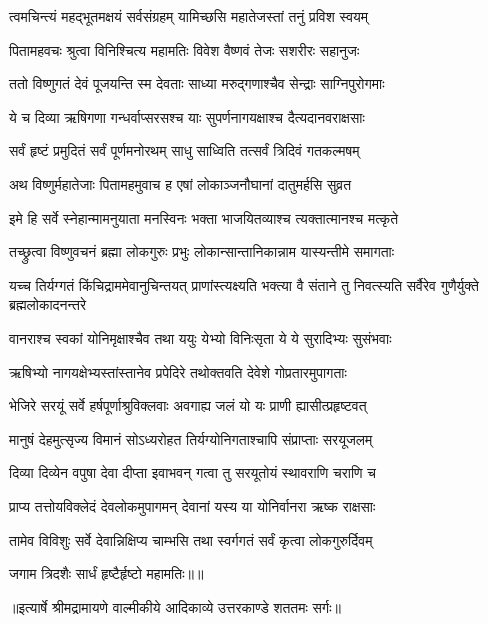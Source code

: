 \twolineshloka
{त्वमचिन्त्यं महद्भूतमक्षयं सर्वसंग्रहम्}
{यामिच्छसि महातेजस्तां तनुं प्रविश स्वयम्} %

\twolineshloka
{पितामहवचः श्रुत्वा विनिश्चित्य महामतिः}
{विवेश वैष्णवं तेजः सशरीरः सहानुजः} %

\twolineshloka
{ततो विष्णुगतं देवं पूजयन्ति स्म देवताः}
{साध्या मरुद्गणाश्चैव सेन्द्राः साग्निपुरोगमाः} %

\twolineshloka
{ये च दिव्या ऋषिगणा गन्धर्वाप्सरसश्च याः}
{सुपर्णनागयक्षाश्च दैत्यदानवराक्षसाः} %

\twolineshloka
{सर्वं हृष्टं प्रमुदितं सर्वं पूर्णमनोरथम्}
{साधु साध्विति तत्सर्वं त्रिदिवं गतकल्मषम्} %

\twolineshloka
{अथ विष्णुर्महातेजाः पितामहमुवाच ह}
{एषां लोकाञ्जनौघानां दातुमर्हसि सुव्रत} %

\twolineshloka
{इमे हि सर्वे स्नेहान्मामनुयाता मनस्विनः}
{भक्ता भाजयितव्याश्च त्यक्तात्मानश्च मत्कृते} %

\twolineshloka
{तच्छ्रुत्वा विष्णुवचनं ब्रह्मा लोकगुरुः प्रभुः}
{लोकान्सान्तानिकान्नाम यास्यन्तीमे समागताः} %

\threelineshloka
{यच्च तिर्यग्गतं किंचिद्राममेवानुचिन्तयत्}
{प्राणांस्त्यक्ष्यति भक्त्या वै संताने तु निवत्स्यति}
{सर्वैरेव गुणैर्युक्ते ब्रह्मलोकादनन्तरे} %

\twolineshloka
{वानराश्च स्वकां योनिमृक्षाश्चैव तथा ययुः}
{येभ्यो विनिःसृता ये ये सुरादिभ्यः सुसंभवाः} %

\twolineshloka
{ऋषिभ्यो नागयक्षेभ्यस्तांस्तानेव प्रपेदिरे}
{तथोक्तवति देवेशे गोप्रतारमुपागताः} %

\twolineshloka
{भेजिरे सरयूं सर्वे हर्षपूर्णाश्रुविक्लवाः}
{अवगाह्य जलं यो यः प्राणी ह्यासीत्प्रहृष्टवत्} %

\twolineshloka
{मानुषं देहमुत्सृज्य विमानं सोऽध्यरोहत}
{तिर्यग्योनिगताश्चापि संप्राप्ताः सरयूजलम्} %

\twolineshloka
{दिव्या दिव्येन वपुषा देवा दीप्ता इवाभवन्}
{गत्वा तु सरयूतोयं स्थावराणि चराणि च} %

\twolineshloka
{प्राप्य तत्तोयविक्लेदं देवलोकमुपागमन्}
{देवानां यस्य या योनिर्वानरा ऋष्क राक्षसाः} %

\twolineshloka
{तामेव विविशुः सर्वे देवान्निक्षिप्य चाम्भसि}
{तथा स्वर्गगतं सर्वं कृत्वा लोकगुरुर्दिवम्} %

{जगाम त्रिदशैः सार्धं हृष्टैर्हृष्टो महामतिः॥॥} %

\addtocounter{shlokacount}{1}


{॥इत्यार्षे श्रीमद्रामायणे वाल्मीकीये आदिकाव्ये उत्तरकाण्डे शततमः सर्गः॥}

